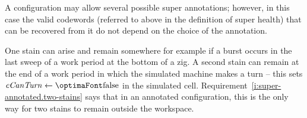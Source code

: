 \documentclass[12pt]{memoir}
\newcommand{\authnote}[3]
{\text{{ \textcolor{#3}{\( \langle\hspace{-0.2em}\langle \)\textsf{\footnotesize #1: #2}\( \rangle\hspace{-0.2em}\rangle \)}}}}
\newcommand{\authnote}[2]{}
\newcommand{\Pnote}[1]{{\authnote{P}{#1}{cyan}}}
\newcommand{\fld}[1]{\ensuremath{\textit{#1\/}}}
\newcommand{\cCanTurn}{\fld{cCanTurn}}
\begin{document}
A configuration may allow several possible super annotations;
however, in this case the valid codewords (referred to above in the definition
of super health) that can be recovered from it do not depend on the choice of the
annotation.

One stain can arise and remain somewhere for example if a burst occurs in the
last sweep of a work period at the bottom of a zig.
A second stain can remain at the end of a work period in which the simulated
machine makes a turn -- this sets \( \cCanTurn\gets\false \) in the simulated
cell.
Requirement~\ref{i:super-annotated.two-stains} says that in an annotated
configuration, this is the only way for two stains to remain outside the
workspace.




\end{document}
